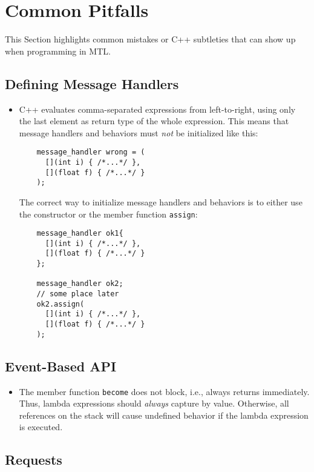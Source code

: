 \section{Common Pitfalls}
\label{pitfalls}

This Section highlights common mistakes or C++ subtleties that can show up when
programming in MTL.

\subsection{Defining Message Handlers}

\begin{itemize}
\item C++ evaluates comma-separated expressions from left-to-right, using only
  the last element as return type of the whole expression. This means that
    message handlers and behaviors must \emph{not} be initialized like this:
    \begin{lstlisting}
    message_handler wrong = (
      [](int i) { /*...*/ },
      [](float f) { /*...*/ }
    );
    \end{lstlisting}
    The correct way to initialize message handlers and behaviors is to either
    use the constructor or the member function \lstinline^assign^:
    \begin{lstlisting}
    message_handler ok1{
      [](int i) { /*...*/ },
      [](float f) { /*...*/ }
    };

    message_handler ok2;
    // some place later
    ok2.assign(
      [](int i) { /*...*/ },
      [](float f) { /*...*/ }
    );
    \end{lstlisting}
\end{itemize}

\subsection{Event-Based API}

\begin{itemize}
\item The member function \lstinline^become^ does not block, i.e., always
  returns immediately. Thus, lambda expressions should \textit{always} capture
    by value. Otherwise, all references on the stack will cause undefined
    behavior if the lambda expression is executed.
\end{itemize}

\subsection{Requests}

